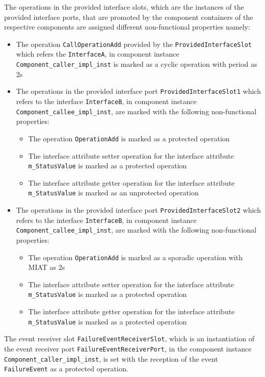 \begin{description}
The operations in the provided interface slots, which are the instances of the provided interface ports, that are promoted by the component containers of the respective components are assigned different non-functional properties namely: 
\begin{itemize}
\item The operation \texttt{CallOperationAdd} provided by the \texttt{ProvidedInterface\allowbreak Slot} which refers the \texttt{InterfaceA}, in component instance \texttt{Component\allowbreak\_caller\_impl\_inst} is marked as a cyclic operation with period as 2s
\item The operations in the provided interface port \texttt{ProvidedInterface\allowbreak Slot1} which refers to the interface \texttt{InterfaceB}, in component instance \texttt{Component\allowbreak\_callee\_impl\_inst}, are marked with the following non-functional properties:
\begin{itemize}
\item The operation \texttt{OperationAdd} is marked as a protected operation
\item The interface attribute setter operation for the interface attribute \texttt{m\_StatusValue} is marked as a protected operation
\item The interface attribute getter operation for the interface attribute \texttt{m\_StatusValue} is marked as an unprotected operation
\end{itemize}
\item The operations in the provided interface port \texttt{ProvidedInterface\allowbreak Slot2} which refers to the interface \texttt{InterfaceB}, in component instance \texttt{Component\allowbreak\_callee\_impl\_inst}, are marked with the following non-functional properties: 
\begin{itemize}
\item The operation \texttt{OperationAdd} is marked as a sporadic operation with MIAT as 2s
\item The interface attribute setter operation for the interface attribute \texttt{m\_StatusValue} is marked as a protected operation
\item The interface attribute getter operation for the interface attribute \texttt{m\_StatusValue} is marked as a protected operation
\end{itemize}
\end{itemize}

The event receiver slot \texttt{FailureEvent\allowbreak ReceiverSlot}, which is an instantiation of the event receiver port \texttt{FailureEvent\allowbreak ReceiverPort}, in the component instance \texttt{Component\allowbreak\_caller\_impl\_inst}, is set with the reception of the event \texttt{FailureEvent} as a protected operation.


\end{description}
